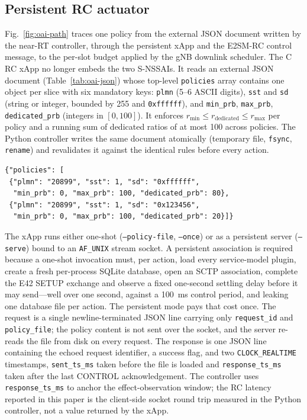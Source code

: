 \subsection{Persistent RC actuator}
Fig.~\ref{fig:oai-path} traces one policy from the external JSON document written by the near-RT controller, through the persistent xApp and the E2SM-RC control message, to the per-slot budget applied by the gNB downlink scheduler. The C RC xApp no longer embeds the two S-NSSAIs. It reads an external JSON document (Table~\ref{tab:oai-json}) whose top-level \texttt{policies} array contains one object per slice with six mandatory keys: \texttt{plmn} (5--6 ASCII digits), \texttt{sst} and \texttt{sd} (string or integer, bounded by 255 and \texttt{0xffffff}), and \texttt{min\_prb}, \texttt{max\_prb}, \texttt{dedicated\_prb} (integers in $[0,100]$). It enforces $r_{\min}\leq r_{\mathrm{dedicated}}\leq r_{\max}$ per policy and a running sum of dedicated ratios of at most 100 across policies. The Python controller writes the same document atomically (temporary file, \texttt{fsync}, \texttt{rename}) and revalidates it against the identical rules before every action.

\begin{table}[t]
\caption{External PRB policy document consumed by the RC actuator.}
\label{tab:oai-json}
\scriptsize
\begin{verbatim}
{"policies": [
 {"plmn": "20899", "sst": 1, "sd": "0xffffff",
  "min_prb": 0, "max_prb": 100, "dedicated_prb": 80},
 {"plmn": "20899", "sst": 1, "sd": "0x123456",
  "min_prb": 0, "max_prb": 100, "dedicated_prb": 20}]}
\end{verbatim}
\end{table}

The xApp runs either one-shot (\texttt{--policy-file}, \texttt{--once}) or as a persistent server (\texttt{--serve}) bound to an \texttt{AF\_UNIX} stream socket. A persistent association is required because a one-shot invocation must, per action, load every service-model plugin, create a fresh per-process SQLite database, open an SCTP association, complete the E42 SETUP exchange and observe a fixed one-second settling delay before it may send---well over one second, against a 100~ms control period, and leaking one database file per action. The persistent mode pays that cost once. The request is a single newline-terminated JSON line carrying only \texttt{request\_id} and \texttt{policy\_file}; the policy content is not sent over the socket, and the server re-reads the file from disk on every request. The response is one JSON line containing the echoed request identifier, a success flag, and two \texttt{CLOCK\_REALTIME} timestamps, \texttt{sent\_ts\_ms} taken before the file is loaded and \texttt{response\_ts\_ms} taken after the last CONTROL acknowledgement. The controller uses \texttt{response\_ts\_ms} to anchor the effect-observation window; the RC latency reported in this paper is the client-side socket round trip measured in the Python controller, not a value returned by the xApp.

